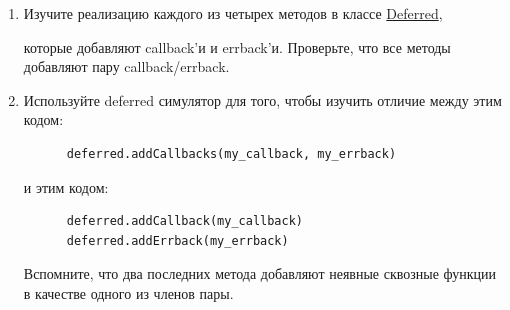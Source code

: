 \begin{enumerate}

\item Изучите реализацию каждого из четырех методов в классе 
\href{http://twistedmatrix.com/trac/browser/tags/releases/twisted-8.2.0/twisted/internet/defer.py#L172}{Deferred}, 
 
которые добавляют callback'и и errback'и. Проверьте, что все методы 
добавляют пару callback/errback. 

\item Используйте deferred симулятор для того, чтобы изучить отличие между этим кодом:


\begin{scriptsize}\begin{verbatim}
      deferred.addCallbacks(my_callback, my_errback)
\end{verbatim}\end{scriptsize}


и этим кодом:


\begin{scriptsize}\begin{verbatim}
      deferred.addCallback(my_callback)
      deferred.addErrback(my_errback)
\end{verbatim}\end{scriptsize}


Вспомните, что два последних метода добавляют неявные сквозные 
функции в качестве одного из членов пары.

\end{enumerate}

